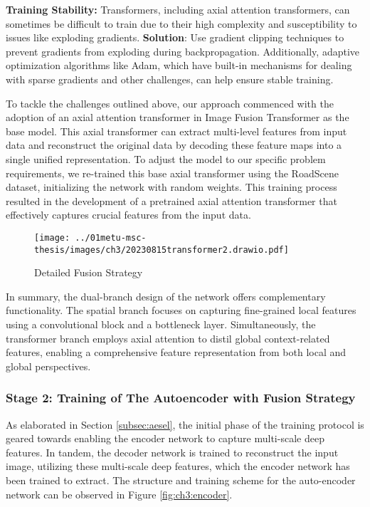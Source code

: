 \begin{list}{}{}
    \item \textbf{Training Stability:}
    Transformers, including axial attention transformers, can sometimes be difficult to train due to their high complexity and susceptibility to issues like exploding gradients. \textbf{Solution}: Use gradient clipping techniques to prevent gradients from exploding during backpropagation. Additionally, adaptive optimization algorithms like Adam, which have built-in mechanisms for dealing with sparse gradients and other challenges, can help ensure stable training.
\end{list}

To tackle the challenges outlined above, our approach commenced with the adoption of an axial attention transformer in Image Fusion Transformer \cite{vs2022image} as the base model. This axial transformer can extract multi-level features from input data and reconstruct the original data by decoding these feature maps into a single unified representation. To adjust the model to our specific problem requirements, we re-trained this base axial transformer using the RoadScene \cite{xu2020aaai} dataset, initializing the network with random weights. This training process resulted in the development of a pretrained axial attention transformer that effectively captures crucial features from the input data.

\begin{figure}[htbp]
    \centering
    \texttt{[image: ../01metu-msc-thesis/images/ch3/20230815transformer2.drawio.pdf]}
    \caption{Detailed Fusion Strategy}
    \label{fig:ch3:fusionM}
\end{figure}

In summary, the dual-branch design of the network offers complementary functionality. The spatial branch focuses on capturing fine-grained local features using a convolutional block and a bottleneck layer. Simultaneously, the transformer branch employs axial attention to distil global context-related features, enabling a comprehensive feature representation from both local and global perspectives.

\subsubsection{Stage 2: Training of The Autoencoder with Fusion Strategy} \label{subsec:fusionloss}

As elaborated in Section \ref{subsec:aesel}, the initial phase of the training protocol is geared towards enabling the encoder network to capture multi-scale deep features. In tandem, the decoder network is trained to reconstruct the input image, utilizing these multi-scale deep features, which the encoder network has been trained to extract. The structure and training scheme for the auto-encoder network can be observed in Figure \ref{fig:ch3:encoder}.

